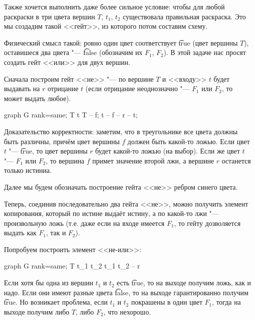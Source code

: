 	\begin{Rem}
		Также хочется выполнить даже более сильное условие: чтобы для любой раскраски в три цвета
		вершин $T$, $t_1$, $t_2$ существовала правильная раскраска.
		Это мы создадим такой <<гейт>>, из которого потом составим схему.
	\end{Rem}
	Физический смысл такой: ровно один цвет соответствует \t{true} (цвет вершины $T$),
	оставишеся два цвета "--- \t{false} (обозначим их $F_1$, $F_2$).
	В этой задаче нас просят создать гейт <<или>> для двух вершин.

	Сначала построим гейт <<не>> "--- по вершине $T$ и <<входу>> $t$ будет выдавать на $r$
	отрицание $t$ (если отрицание неоднозначно "--- $F_1$ или $F_2$, то может выдать любое).
	\begin{center}
		\begin{dot2tex}[scale=0.8,options=-tmath]
			graph G {
				{rank=same; T t}
				T -- f;
				t -- f -- r -- t;
			}
		\end{dot2tex}
	\end{center}
	Доказательство корректности: заметим, что в треугольнике все цвета должны быть различны, причём
	цвет вершины $f$ должен быть какой-то ложью.
	Если цвет $t$ "--- \t{true}, то цвет вершины $r$ будет какой-то ложью (на выбор).
	Если же цвет $t$ "--- $F_1$ или $F_2$, то вершина $f$ примет значение второй лжи, а
	вершине $r$ останется только истиниа.

	Далее мы будем обозначать построение гейта <<не>> ребром синего цвета.

	Теперь, соединив последовательно два гейта <<не>>, можно получить элемент копирования, который
	по истине выдаёт истину, а по какой-то лжи "--- произвольную ложь (т.е. даже если на входе имеется
	$F_1$, то гейту дозволяется выдать как $F_1$, так и $F_2$).

	Попробуем построить элемент <<не-или>>:
	\begin{center}
		\begin{dot2tex}[scale=0.8,options=-tmath]
			graph G {
				{rank=same; T t_1 t_2}
				{t_1 t_2} -- r
			}
		\end{dot2tex}
	\end{center}
	Если хотя бы одна из вершин $t_1$ и $t_2$ есть \t{true}, то на выходе получим ложь, как и надо.
	Если они имеют разные цвета \t{false}, то на выходе гарантированно получим \t{true}.
	Но возникает проблема, если $t_1$ и $t_2$ покрашены в один цвет $F_1$,
	тогда на выходе получим либо $T$, либо $F_2$, что нехорошо.


